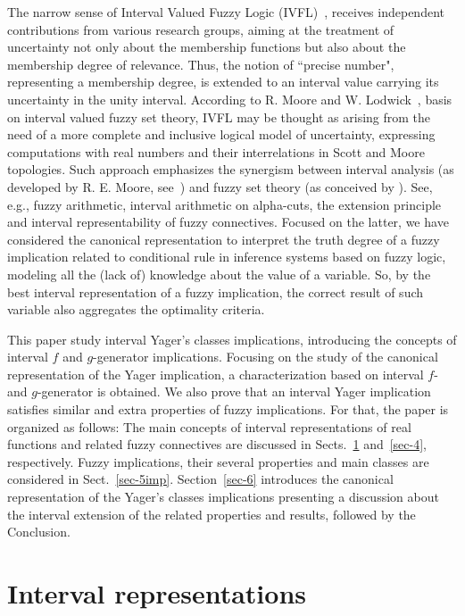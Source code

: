 \documentclass[12pt]{article}
\theoremstyle{plain}
\theoremstyle{remark}
\theoremstyle{definition}
\theoremstyle{proposition}
\begin{document}
The narrow sense of Interval Valued Fuzzy Logic (IVFL)~\cite{Zad75}, receives independent contributions from various research groups, aiming at the treatment of uncertainty not only about the membership functions but also about the membership degree of relevance. Thus, the notion of ``precise number", representing a membership degree, is extended to an interval value carrying its uncertainty in the unity interval.
According to R. Moore and W. Lodwick~\cite{Lod02}, basis on interval valued fuzzy set theory, IVFL may be thought
as arising from the need of a more complete and inclusive logical model of uncertainty, expressing computations with real numbers and their interrelations in Scott and Moore topologies. Such approach emphasizes the synergism between interval analysis (as developed by R. E. Moore, see~\cite{Moo79, Moo03,keafort}) and fuzzy set theory (as conceived by \cite{Zad65}). See, e.g., fuzzy arithmetic, interval arithmetic on alpha-cuts, the extension principle and interval representability of fuzzy connectives. Focused on the latter, we have considered the canonical representation to interpret the truth degree of a fuzzy implication related to conditional rule in inference systems based on fuzzy logic, modeling all the (lack of) knowledge about the value of a variable. So, by the best interval representation of a fuzzy implication, the correct result of such variable also aggregates the optimality criteria\cite{Hic01}.

 This paper study interval Yager's classes implications, introducing the concepts of interval $f$ and $g$-generator implications. Focusing on the study of the canonical representation of the Yager implication, a characterization based on interval $f$- and $g$-generator is obtained. We also prove that an interval Yager implication satisfies similar and extra properties of fuzzy implications. For that, the paper is organized as follows: The main concepts of interval representations of real functions and related fuzzy connectives are discussed in Sects.~\ref{sec-3} and~\ref{sec-4}, respectively. Fuzzy implications, their several properties and main classes are considered in Sect.~\ref{sec-5imp}. Section~\ref{sec-6} introduces the canonical representation of the Yager's classes implications presenting a discussion about the interval extension of the related properties and results, followed by the Conclusion.

\section{Interval representations}\label{sec-3}
\end{document}
